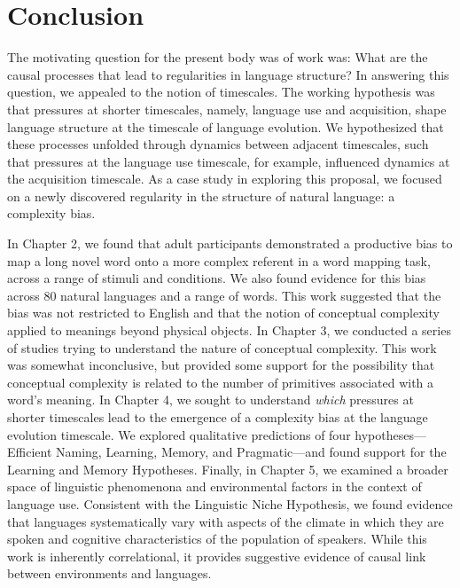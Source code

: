 
\chapter{Conclusion}
\label{chapter:conclusion}
The motivating question for the present body was of work was: What are the causal processes that lead to regularities in language structure?   In answering this question, we appealed to the notion of timescales. The working hypothesis was that pressures at shorter timescales, namely, language use and acquisition, shape language structure at the timescale of language evolution. We hypothesized that these processes unfolded through dynamics between adjacent timescales, such that pressures at the language use timescale, for example, influenced dynamics at the acquisition timescale.  As a case study in exploring this proposal, we focused on a newly discovered regularity in the structure of natural language: a complexity bias.

In Chapter 2, we found that adult participants demonstrated a productive bias to map a long novel word onto a more complex referent in a word mapping task, across a range of stimuli and conditions. We  also found evidence for this bias across 80 natural languages and a range of words. This work suggested that  the bias was not restricted to English and that the notion of conceptual complexity applied to meanings beyond physical objects. In Chapter 3, we conducted a series of studies trying to understand the nature of conceptual complexity. This work was somewhat inconclusive, but provided some support for the possibility that conceptual complexity is related to the number of primitives associated with a word's meaning. In Chapter 4, we sought to understand {\it which} pressures at shorter timescales lead to the emergence of a complexity bias at the language evolution timescale. We explored qualitative predictions of four hypotheses---Efficient Naming, Learning, Memory, and Pragmatic---and found support for the Learning and Memory Hypotheses. Finally, in Chapter 5, we examined a broader space of linguistic phenomenona and environmental factors in the context of language use. Consistent with the Linguistic Niche Hypothesis, we found evidence that languages systematically vary with aspects of the climate in which they are spoken and cognitive characteristics of the population of speakers. While this work is inherently correlational, it provides suggestive evidence of causal link between environments and languages.


